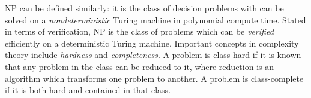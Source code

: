\documentclass[%
 aip,
 amsmath,amssymb,
 reprint,%
]{revtex4-1}
\newcommand{\note}[1]{ {\color{purple} #1}}
\begin{document}


$\mathrm{NP}$ can be defined similarly: it is the class of decision problems with can be solved on a {\it nondeterministic} Turing machine in polynomial compute time. %
Stated in terms of verification, $\mathrm{NP}$ is the class of problems which can be {\it verified} efficiently on a deterministic Turing machine. Important concepts in complexity theory include {\it hardness} and {\it completeness}.  A problem is class-hard if it is known that any problem in the class can be reduced to it, where reduction is an algorithm which transforms one problem to another. A problem is class-complete if it is both hard and contained in that class.


\end{document}
